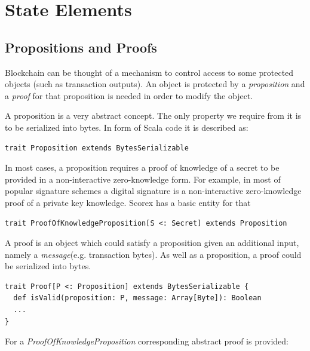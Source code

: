 \documentclass[]{report}   %
\begin{document}
\section{State Elements}

\subsection{Propositions and Proofs}

Blockchain can be thought of a mechanism to control access to some protected objects (such as transaction outputs). An object is protected by a {\em proposition} and a {\em proof} for that proposition is needed in order to modify the object.


A proposition is a very abstract concept. The only property we require from it is to be serialized into bytes. In form of Scala code it is described as:

\small{
\begin{lstlisting}
trait Proposition extends BytesSerializable
\end{lstlisting}
}
In most cases, a proposition requires a proof of knowledge of a secret to be provided in a non-interactive zero-knowledge form. For example, in most of popular signature schemes a digital signature is a non-interactive zero-knowledge proof of a private key knowledge. Scorex has a basic entity for that

\begin{lstlisting}
trait ProofOfKnowledgeProposition[S <: Secret] extends Proposition
\end{lstlisting}

A proof is an object which could satisfy a proposition given an additional input, namely a \textit{message}(e.g. transaction bytes). As well as a proposition, a proof could be serialized into bytes. 

\begin{lstlisting}
trait Proof[P <: Proposition] extends BytesSerializable {
  def isValid(proposition: P, message: Array[Byte]): Boolean
  ...
}
\end{lstlisting}

For a \textit{ProofOfKnowledgeProposition} corresponding abstract proof is provided:
\end{document}
